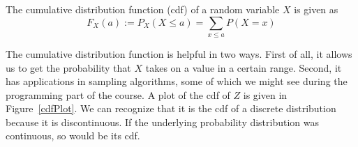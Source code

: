 \documentclass[a4paper,11pt,leqno]{report}
\begin{document}
\newpage
\begin{Definition}
The cumulative distribution function (cdf) of a random variable $ X $ is given as
$$ F_{X}(a) := P_{X}(X \leq a) = {\underset{x \leq a}{\sum}}P(X=x) $$
\end{Definition}

The cumulative distribution function is helpful in two ways. First of all, it allows us to get the probability that
$ X $ takes on a value in a certain range. Second, it has applications in sampling algorithms, some of which we might
see during the programming part of the course. A plot of the cdf of $ Z $ is given in Figure~\ref{cdfPlot}. We can recognize that it is the cdf of a discrete
distribution because it is discontinuous. If the underlying probability distribution was continuous, so would be its cdf.
\end{document}
